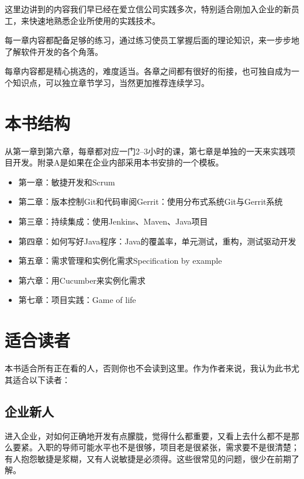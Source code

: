 这里边讲到的内容我们早已经在爱立信公司实践多次，特别适合刚加入企业的新员工，来快速地熟悉企业所使用的实践技术。

每一章内容都配备足够的练习，通过练习使员工掌握后面的理论知识，来一步步地了解软件开发的各个角落。

每章内容都是精心挑选的，难度适当。各章之间都有很好的衔接，也可独自成为一个知识点，可以独立章节学习，当然更加推荐连续学习。

\section{本书结构}
\label{本书结构}

从第一章到第六章，每章都对应一门2--3小时的课，第七章是单独的一天来实践项目开发。附录A是如果在企业内部采用本书安排的一个模板。

\begin{itemize}
\item 第一章：敏捷开发和Scrum

\item 第二章：版本控制Git和代码审阅Gerrit：使用分布式系统Git与Gerrit系统

\item 第三章：持续集成：使用Jenkins、Maven、Java项目

\item 第四章：如何写好Java程序：Java的覆盖率，单元测试，重构，测试驱动开发

\item 第五章：需求管理和实例化需求Specification by example

\item 第六章：用Cucumber来实例化需求

\item 第七章：项目实践：Game of life

\end{itemize}

\section{适合读者}
\label{适合读者}

本书适合所有正在看的人，否则你也不会读到这里。作为作者来说，我认为此书尤其适合以下读者：

\subsection{企业新人}
\label{企业新人}

进入企业，对如何正确地开发有点朦胧，觉得什么都重要，又看上去什么都不是那么要紧。入职的导师可能水平也不是很够，项目老是很紧张，需求要不是很清楚；有人抱怨敏捷是浆糊，又有人说敏捷是必须得。这些很常见的问题，很少在前期了解。

